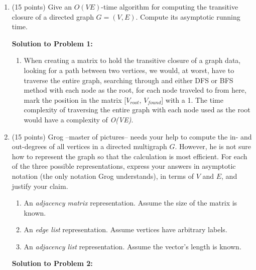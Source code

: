 \documentclass[12pt]{article}
\begin{document}
\renewcommand{\headrulewidth}{0.4pt}

\vspace{-3mm}
\begin{enumerate}
    \item (15 points) Give an $O(VE)$-time algorithm for computing the transitive closure of a directed graph $G=(V,E)$.  Compute its asymptotic running time.
    
    \pagebreak
\textbf{Solution to Problem 1:}

\begin{enumerate}
    \item When creating a matrix to hold the transitive closure of a graph data, looking for a path between two vertices, we would, at worst, have to traverse the entire graph, searching through and either DFS or BFS method with each node as the root, for each node traveled to from here, mark the position in the matrix [$V_{root}$, $V_{found}$] with a 1. The time complexity of traversing the entire graph with each node used as the root would have a complexity of \textit{O(VE)}.
\end{enumerate}
\pagebreak

	\item (15 points) Grog --master of pictures-- needs your help to compute the in- and out-degrees of all vertices in a directed multigraph $G$. However, he is not sure how to represent the graph so that the calculation is most efficient. For each of the three possible representations, express your answers in asymptotic notation (the only notation Grog understands), in terms of $V$ and $E$, and justify your claim.
	\begin{enumerate}
	\item An {\em adjacency matrix} representation. Assume the size of the matrix is known.
	\item An {\em edge list} representation. Assume vertices have arbitrary labels.
	\item An {\em adjacency list} representation. Assume the vector's length is known.
	\end{enumerate}
	
	\pagebreak
\textbf{Solution to Problem 2:}


\end{enumerate}
\end{document}
